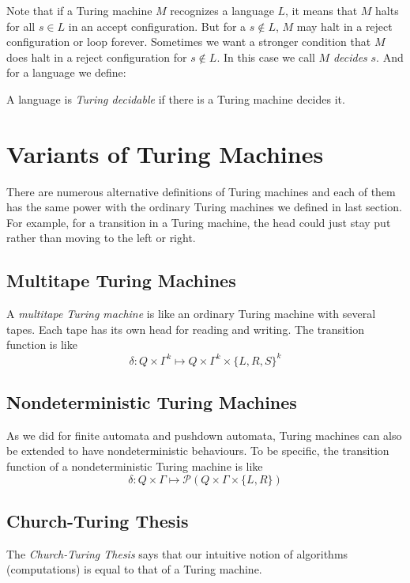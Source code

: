 \documentclass[11pt]{article}
\begin{document}
Note that if a Turing machine $M$ recognizes a language $L$, it means that $M$ halts for all
$s \in L$ in an accept configuration. But for a $s \not\in L$, $M$ may halt in a reject
configuration or loop forever. Sometimes we want a stronger condition that $M$ does halt in a reject
configuration for $s \not\in L$. In this case we call $M$ \emph{decides} $s$. And for a language we
define:

\begin{definition}
A language is \emph{Turing decidable} if there is a Turing machine decides it.
\end{definition}

\section{Variants of Turing Machines}

There are numerous alternative definitions of Turing machines and each of them has the same power
with the ordinary Turing machines we defined in last section. For example, for a transition in a
Turing machine, the head could just stay put rather than moving to the left or right.

\subsection{Multitape Turing Machines}

A \emph{multitape Turing machine} is like an ordinary Turing machine with several tapes. Each tape
has its own head for reading and writing. The transition function is like
\[
  \delta: Q \times \Gamma^k \mapsto Q \times \Gamma^k \times \{L,R,S\}^k
\]

\subsection{Nondeterministic Turing Machines}

As we did for finite automata and pushdown automata, Turing machines can also be extended to have
nondeterministic behaviours. To be specific, the transition function of a nondeterministic Turing
machine is like
\[
  \delta: Q \times \Gamma \mapsto \mathcal{P}(Q \times \Gamma \times \{L,R\})
\]

\subsection{Church-Turing Thesis}

The \emph{Church-Turing Thesis} says that our intuitive notion of algorithms (computations) is equal
to that of a Turing machine.
\end{document}
